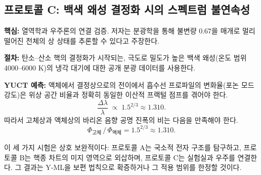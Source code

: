 \documentclass[11pt,a4paper]{article}
\begin{document}
	\subsection{프로토콜 C: 백색 왜성 결정화 시의 스펙트럼 불연속성}
	\textbf{핵심:} 열역학과 우주론의 연결 검증. 저자는 분광학을 통해 불변량 \(0.67\)을 매개로 멀리 떨어진 천체의 상 상태를 추론할 수 있다고 주장한다.
	
	\textbf{절차:} 탄소–산소 핵의 결정화가 시작되는, 극도로 밀도가 높은 백색 왜성(온도 범위 4000–6000 K)의 냉각 대기에 대한 공개 분광 데이터를 사용한다.
	
	\textbf{YUCT 예측:} 액체에서 결정상으로의 전이에서 흡수선 프로파일의 변화율(포논 모드 강도)은 위상 공간 비율과 정확히 동일한 이산적 프랙털 점프를 겪어야 한다.
	\begin{equation}
		\frac{\Delta \lambda}{\lambda} \;\propto\; 1.5^{2/3} \approx 1.310 .
	\end{equation}
	따라서 고체상과 액체상의 바리온 음향 공명 진폭의 비는 다음을 만족해야 한다.
	\begin{equation}
		\Phi_{\text{고체}} \,/\, \Phi_{\text{액체}} = 1.5^{2/3} \approx 1.310 .
	\end{equation}
	
	이 세 가지 시험은 상호 보완적이다: 프로토콜 A는 국소적 전자 구조를 탐구하고, 프로토콜 B는 핵종 차트의 미지 영역으로 외삽하며, 프로토콜 C는 실험실과 우주를 연결한다. 그 결과는 Y‑ML을 보편 법칙으로 확증하거나 그 적용 범위를 한정할 것이다.
	
\end{document}
